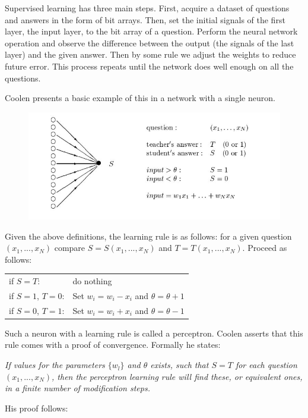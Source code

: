 \documentclass[]{article}
\theoremstyle{plain}
\theoremstyle{definition}
\begin{document}
Supervised learning has three main steps. First, acquire a dataset of questions and answers in the form of bit arrays. Then, set the initial signals of the first layer, the input layer, to the bit array of a question. Perform the neural network operation and observe the difference between the output (the signals of the last layer) and the given answer. Then by some rule we adjust the weights to reduce future error. This process repeats until the network does well enough on all the questions. 

Coolen presents a basic example of this in a network with a single neuron.
\begin{figure}[h]
\centering
\includegraphics[scale=0.70]{CoolenPerceptron.jpg}
\end{figure}

Given the above definitions, the learning rule is as follows: for a given question $ (x_1,..., x_N) $ compare $ S = S(x_1,...,x_N ) $ and $ T = T(x_1,...,x_N ) $. Proceed as follows:
\begin{table}[h]
\begin{tabular}{ll}
if $ S=T $: & do nothing\\
if $ S = 1 $, $ T = 0 $:& Set $ w_i = w_i - x_i $ and $ \theta = \theta + 1 $\\
if $ S = 0 $, $ T = 1 $:& Set $ w_i = w_i + x_i $ and $ \theta = \theta - 1 $\\
\end{tabular}
\end{table}
Such a neuron with a learning rule is called a perceptron. 
Coolen asserts that this rule comes with a proof of convergence. Formally he states:

\textit{If values for the parameters $ \{w_l\} $ and $ \theta $ exists, such that $ S = T $ for each
question $ (x_1,...,x_N ) $, then the perceptron learning rule will find these,
or equivalent ones, in a finite number of modification steps.}

His proof follows:
\end{document}
